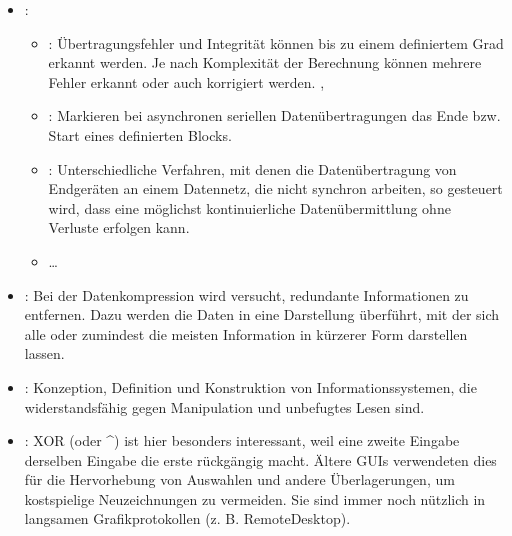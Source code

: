 \documentclass[a4paper,10pt,english]{report}
\begin{document}
\sphinxAtStartPar
{}
\begin{itemize}
\item {} 
\sphinxAtStartPar
{}:
\begin{itemize}
\item {} 
\sphinxAtStartPar
{}: Übertragungsfehler und Integrität      können bis zu einem definiertem Grad erkannt werden. Je nach   Komplexität der Berechnung können mehrere Fehler erkannt oder auch korrigiert werden.
, 

\item {} 
\sphinxAtStartPar
{}: Markieren bei asynchronen seriellen Datenübertragungen das Ende bzw. Start eines definierten Blocks.

\item {} 
\sphinxAtStartPar
{}: Unterschiedliche Verfahren, mit denen die Datenübertragung von Endgeräten an einem Datennetz, die nicht synchron arbeiten, so gesteuert wird, dass eine möglichst kontinuierliche Datenübermittlung ohne Verluste erfolgen kann.

\item {} 
\sphinxAtStartPar
…

\end{itemize}

\item {} 
\sphinxAtStartPar
{}: Bei der Datenkompression wird versucht, redundante Informationen zu entfernen. Dazu werden die Daten in eine Darstellung überführt, mit der sich alle \textendash{} oder zumindest die meisten \textendash{} Information in kürzerer Form darstellen lassen.

\item {} 
\sphinxAtStartPar
{}: Konzeption, Definition und Konstruktion von Informationssystemen, die widerstandsfähig gegen Manipulation und unbefugtes Lesen sind. 

\item {} 
\sphinxAtStartPar
{}: XOR (oder \textasciicircum{}) ist hier besonders interessant, weil eine zweite Eingabe derselben Eingabe die erste rückgängig macht. Ältere GUIs verwendeten dies für die Hervorhebung von Auswahlen und andere Überlagerungen, um kostspielige Neuzeichnungen zu vermeiden. Sie sind immer noch nützlich in langsamen Grafikprotokollen (z. B. Remote\sphinxhyphen{}Desktop).

\end{itemize}
\end{document}
